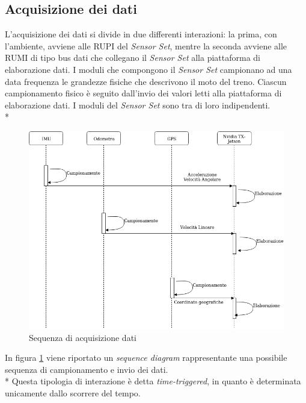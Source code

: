 	\subsection{Acquisizione dei dati}
	L'acquisizione dei dati si divide in due differenti interazioni: la prima, con l'ambiente, avviene alle RUPI del \emph{Sensor Set}, mentre la seconda avviene alle RUMI di tipo bus dati che collegano il \emph{Sensor Set} alla piattaforma di elaborazione dati.
	I moduli che compongono il \emph{Sensor Set} campionano ad una data frequenza le grandezze fisiche che descrivono il moto del treno. Ciascun campionamento fisico \`e seguito dall'invio dei valori letti alla piattaforma di elaborazione dati. I moduli del \emph{Sensor Set} sono tra di loro indipendenti.\\* 
	\begin{figure}[h]
		\centering
		\includegraphics[width=0.7\linewidth]{img/seqdiag}
		\caption{Sequenza di acquisizione dati}
		\label{fig:seqdiag}
	\end{figure}
	In figura \ref{fig:seqdiag} viene riportato un \emph{sequence diagram} rappresentante una possibile sequenza di campionamento e invio dei dati.\\*
	Questa tipologia di interazione \`e detta \emph{time-triggered}, in quanto \`e determinata unicamente dallo scorrere del tempo. \cite{timetriggered}
